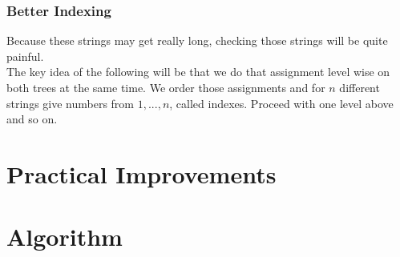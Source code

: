 \documentclass[a4paper,12pt]{article}
\theoremstyle{definition}
\begin{document}
	\subsubsection{Better Indexing}
	Because these strings may get really long, checking those strings will be quite painful.\\
	The key idea of the following will be that we do that assignment level wise on both trees at the same time. We order those assignments and for $n$ different strings give numbers from $1,...,n$, called indexes. Proceed with one level above and so on.
	\section{Practical Improvements}
	\section{Algorithm}
		
\end{document}
